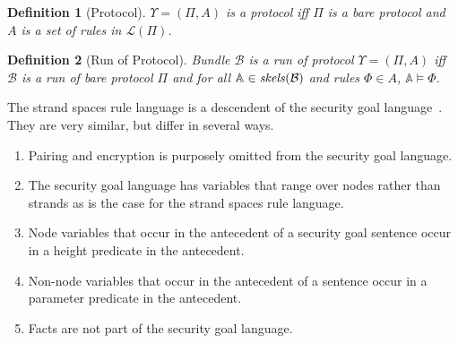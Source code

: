 \documentclass[12pt]{article}
\newcommand{\lang}{\mathcal{L}}
\newcommand{\skel}{\mathbb{A}}
\newcommand{\bun}{\ensuremath{\mathcal{B}}}
\newcommand{\skeletons}{\fn{skels}}
\newtheorem{definition}{Definition}
\begin{document}
\begin{definition}[Protocol]\label{def:protocol}
  $\Upsilon=(\Pi,A)$ is a \emph{protocol} iff $\Pi$ is a bare protocol
  and $A$ is a set of rules in $\lang(\Pi)$.
\end{definition}

\begin{definition}[Run of Protocol]\label{def:run of protocol}
  Bundle $\bun$ is a \emph{run of protocol} $\Upsilon=(\Pi,A)$ iff
  $\bun$ is a run of bare protocol $\Pi$ and for all
  $\skel\in\skeletons(\bun)$ and rules $\Phi\in A$,
  $\skel\models\Phi$.
\end{definition}

The strand spaces rule language is a descendent of the security goal
language~\cite{Guttman14}.  They are very similar, but differ in several
ways.

\begin{enumerate}
\item Pairing and encryption is purposely omitted from the security
  goal language.
\item The security goal language has variables that range over nodes
  rather than strands as is the case for the strand spaces rule
  language.
\item Node variables that occur in the antecedent of a security goal
  sentence occur in a height predicate in the antecedent.
\item Non-node variables that occur in the antecedent of a sentence occur
  in a parameter predicate in the antecedent.
\item Facts are not part of the security goal language.
\end{enumerate}



\end{document}
